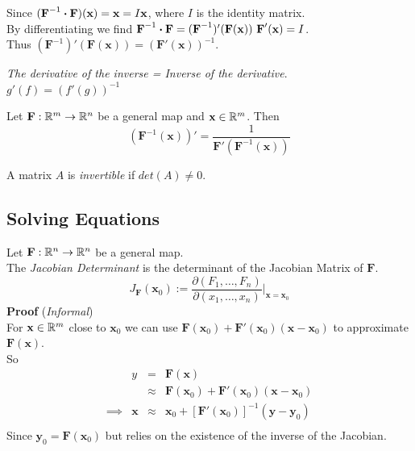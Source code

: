 \documentclass[11pt,a4paper]{article}
\begin{document}
Since $(\textbf{F}^{-1}\boldsymbol{\cdot}\textbf{F})(\textbf{x}) = \textbf{x} = I\textbf{x}$, where $I$ is the identity matrix.\\
By differentiating we find $\textbf{F}^{-1} \dotprod \textbf{F} = (\textbf{F}^{-1})' (\textbf{F}(\textbf{x}))\ \textbf{F}'(\textbf{x}) = I$.\\
Thus $(\textbf{F}^{-1})'(\textbf{F}(\textbf{x})) = (\textbf{F}'(\textbf{x}))^{-1}$.
\begin{center}
\textit{The derivative of the inverse = Inverse of the derivative}.\\
$g'(f)=(f'(g))^{-1}$
\end{center}

Let $\textbf{F}:\mathbb{R}^m\to\mathbb{R}^n$ be a general map and $\textbf{x}\in\mathbb{R}^m$. Then
$$(\textbf{F}^{-1}(\textbf{x}))'=\frac{1}{\textbf{F}'(\textbf{F}^{-1}(\textbf{x}))}$$

A matrix $A$ is \textit{invertible} if $det(A)\neq0$.

\subsection{Solving Equations}

Let $\textbf{F} : \mathbb{R}^n\to\mathbb{R}^n$ be a general map.\\
The \textit{Jacobian Determinant} is the determinant of the Jacobian Matrix of $\textbf{F}$.
$$J_{\textbf{F}}(\textbf{x}_0) := \frac{\partial(F_1, \dots, F_n)}{\partial(x_1, \dots, x_n)}\bigg\vert_{\textbf{x}=\textbf{x}_0}$$
\textbf{Proof} (\textit{Informal})\\
For $\textbf{x}\in\mathbb{R}^m$ close to $\textbf{x}_0$ we can use $\textbf{F}(\textbf{x}_0)+\textbf{F}'(\textbf{x}_0)(\textbf{x}-\textbf{x}_0)$ to approximate $\textbf{F}(\textbf{x})$.\\
So\[\begin{array}{rrcl}
&y&=&\textbf{F}(\textbf{x})\\
&&\approx& \textbf{F}(\textbf{x}_0)+\textbf{F}'(\textbf{x}_0)(\textbf{x}-\textbf{x}_0)\\

\implies&\textbf{x}&\approx&\textbf{x}_0+[\textbf{F}'(\textbf{x}_0)]^{-1}(\textbf{y}-\textbf{y}_0)\\
\end{array}\]
Since $\textbf{y}_0 = \textbf{F}(\textbf{x}_0)$ but relies on the existence of the inverse of the Jacobian.\\
\end{document}
